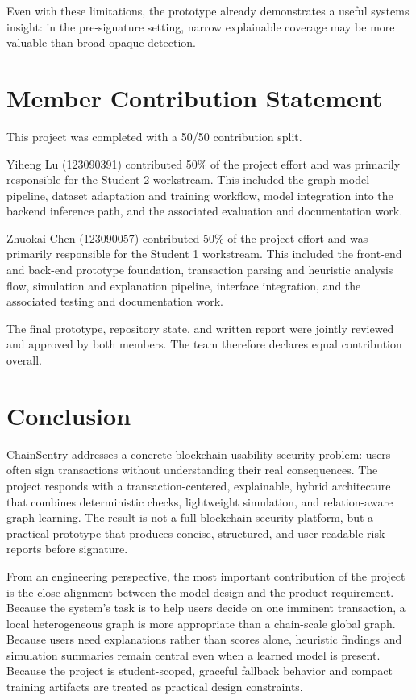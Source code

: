 \documentclass[11pt]{article}
\begin{document}
Even with these limitations, the prototype already demonstrates a useful systems insight: in the pre-signature setting, narrow explainable coverage may be more valuable than broad opaque detection.

\section{Member Contribution Statement}

This project was completed with a 50/50 contribution split.

Yiheng Lu (123090391) contributed 50\% of the project effort and was primarily responsible for the Student 2 workstream. This included the graph-model pipeline, dataset adaptation and training workflow, model integration into the backend inference path, and the associated evaluation and documentation work.

Zhuokai Chen (123090057) contributed 50\% of the project effort and was primarily responsible for the Student 1 workstream. This included the front-end and back-end prototype foundation, transaction parsing and heuristic analysis flow, simulation and explanation pipeline, interface integration, and the associated testing and documentation work.

The final prototype, repository state, and written report were jointly reviewed and approved by both members. The team therefore declares equal contribution overall.

\section{Conclusion}

ChainSentry addresses a concrete blockchain usability-security problem: users often sign transactions without understanding their real consequences. The project responds with a transaction-centered, explainable, hybrid architecture that combines deterministic checks, lightweight simulation, and relation-aware graph learning. The result is not a full blockchain security platform, but a practical prototype that produces concise, structured, and user-readable risk reports before signature.

From an engineering perspective, the most important contribution of the project is the close alignment between the model design and the product requirement. Because the system's task is to help users decide on one imminent transaction, a local heterogeneous graph is more appropriate than a chain-scale global graph. Because users need explanations rather than scores alone, heuristic findings and simulation summaries remain central even when a learned model is present. Because the project is student-scoped, graceful fallback behavior and compact training artifacts are treated as practical design constraints.
\end{document}
